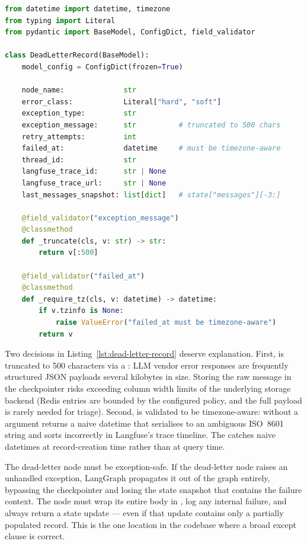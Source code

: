 \begin{lstlisting}[language=Python,
  caption={DeadLetterRecord Pydantic model ---
    \texttt{src/resilience/dead\_letter.py}},
  label={lst:dead-letter-record}]
from datetime import datetime, timezone
from typing import Literal
from pydantic import BaseModel, ConfigDict, field_validator

class DeadLetterRecord(BaseModel):
    model_config = ConfigDict(frozen=True)

    node_name:              str
    error_class:            Literal["hard", "soft"]
    exception_type:         str
    exception_message:      str          # truncated to 500 chars
    retry_attempts:         int
    failed_at:              datetime     # must be timezone-aware
    thread_id:              str
    langfuse_trace_id:      str | None
    langfuse_trace_url:     str | None
    last_messages_snapshot: list[dict]   # state["messages"][-3:]

    @field_validator("exception_message")
    @classmethod
    def _truncate(cls, v: str) -> str:
        return v[:500]

    @field_validator("failed_at")
    @classmethod
    def _require_tz(cls, v: datetime) -> datetime:
        if v.tzinfo is None:
            raise ValueError("failed_at must be timezone-aware")
        return v
\end{lstlisting}

Two decisions in Listing~\ref{lst:dead-letter-record} deserve explanation.
First,  is truncated to 500 characters via a
: LLM vendor error responses are frequently
structured JSON payloads several kilobytes in size. Storing the raw message
in the checkpointer risks exceeding column width limits of the underlying
storage backend (Redis entries are bounded by the configured
 policy, and the full payload is rarely needed for triage).
Second,  is validated to be timezone-aware:
 without a  argument returns a naive datetime
that serialises to an ambiguous ISO~8601 string and sorts incorrectly in
Langfuse's trace timeline. The  catches naive
datetimes at record-creation time rather than at query time.

The dead-letter node must be exception-safe. If the dead-letter node raises
an unhandled exception, LangGraph propagates it out of the graph entirely,
bypassing the checkpointer and losing the state snapshot that contains the
failure context. The node must wrap its entire body in , log any internal failure, and always return a state update ---
even if that update contains only a partially populated record. This is the
one location in the codebase where a broad except clause is correct.

